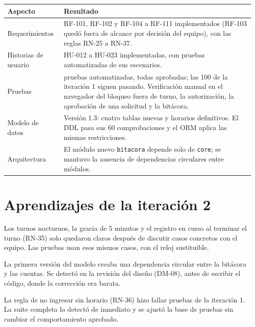 \begin{longtable}{>{\raggedright\arraybackslash}p{4.6cm}>{\raggedright\arraybackslash}p{9.8cm}}
\toprule
\textbf{Aspecto} & \textbf{Resultado}\\
\midrule\endhead
Requerimientos & RF-101, RF-102 y RF-104 a RF-111 implementados (RF-103 quedó fuera de alcance por decisión del equipo), con las reglas RN-25 a RN-37.\\
Historias de usuario & HU-012 a HU-023 implementadas, con pruebas automatizadas de sus escenarios.\\
Pruebas & 154 pruebas automatizadas, todas aprobadas; las 100 de la iteración 1 siguen pasando. Verificación manual en el navegador del bloqueo fuera de turno, la autorización, la aprobación de una solicitud y la bitácora.\\
Modelo de datos & Versión 1.3: cuatro tablas nuevas y horarios definitivos. El DDL pasa sus 60 comprobaciones y el ORM aplica las mismas restricciones.\\
Arquitectura & El módulo nuevo \texttt{bitacora} depende solo de \texttt{core}; se mantuvo la ausencia de dependencias circulares entre módulos.\\
\bottomrule
\end{longtable}

\section{Aprendizajes de la iteración 2}
\begin{description}[style=nextline]
  \item[Las reglas de tiempo necesitan ejemplos concretos] Los turnos nocturnos, la gracia de 5 minutos y el registro en curso al terminar el turno (RN-35) solo quedaron claros después de discutir casos concretos con el equipo. Las pruebas usan esos mismos casos, con el reloj sustituible.
  \item[Revisar las dependencias en el diseño] La primera versión del modelo creaba una dependencia circular entre la bitácora y las cuentas. Se detectó en la revisión del diseño (DM-08), antes de escribir el código, donde la corrección era barata.
  \item[La regresión protege lo ya entregado] La regla de no ingresar sin horario (RN-36) hizo fallar pruebas de la iteración 1. La suite completa lo detectó de inmediato y se ajustó la base de pruebas sin cambiar el comportamiento aprobado.
\end{description}

